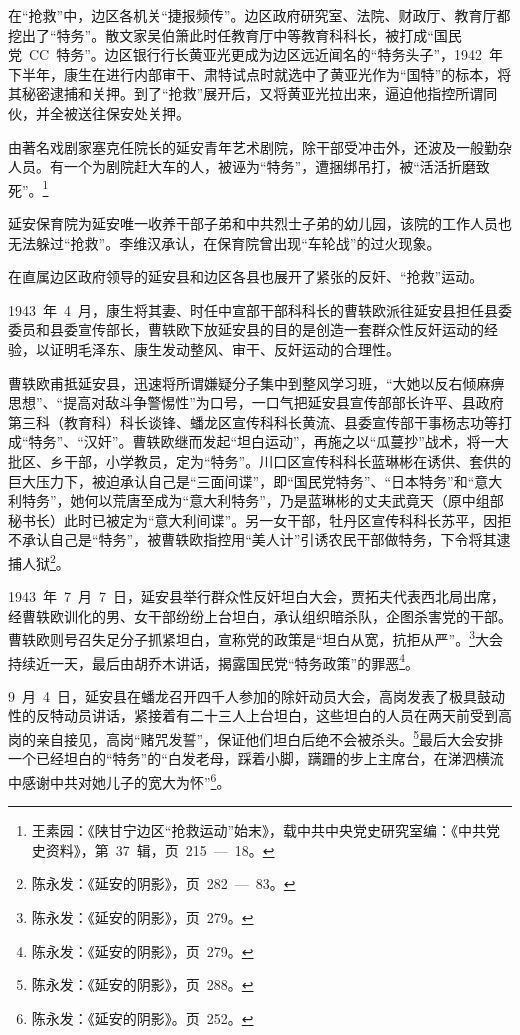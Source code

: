 在“抢救”中，边区各机关“捷报频传”。边区政府研究室、法院、财政厅、教育厅都挖出了“特务”。散文家吴伯箫此时任教育厅中等教育科科长，被打成“国民党~CC~特务”。边区银行行长黄亚光更成为边区远近闻名的“特务头子”，1942~年下半年，康生在进行内部审干、肃特试点时就选中了黄亚光作为“国特”的标本，将其秘密逮捕和关押。到了“抢救”展开后，又将黄亚光拉出来，逼迫他指控所谓同伙，并全被送往保安处关押。

由著名戏剧家塞克任院长的延安青年艺术剧院，除干部受冲击外，还波及一般勤杂人员。有一个为剧院赶大车的人，被诬为“特务”，遭捆绑吊打，被“活活折磨致死”。\footnote{王素园：《陕甘宁边区“抢救运动”始末》，载中共中央党史研究室编：《中共党史资料》，第~37~辑，页~215~—~18。}

延安保育院为延安唯一收养干部子弟和中共烈士子弟的幼儿园，该院的工作人员也无法躲过“抢救”。李维汉承认，在保育院曾出现“车轮战”的过火现象。

在直属边区政府领导的延安县和边区各县也展开了紧张的反奸、“抢救”运动。

1943~年~4~月，康生将其妻、时任中宣部干部科科长的曹轶欧派往延安县担任县委委员和县委宣传部长，曹轶欧下放延安县的目的是创造一套群众性反奸运动的经验，以证明毛泽东、康生发动整风、审干、反奸运动的合理性。

曹轶欧甫抵延安县，迅速将所谓嫌疑分子集中到整风学习班，“大她以反右倾麻痹思想”、“提高对敌斗争警惕性”为口号，一口气把延安县宣传部部长许平、县政府第三科（教育科）科长谈锋、蟠龙区宣传科科长黄流、县委宣传部干事杨志功等打成“特务”、“汉奸”。曹轶欧继而发起“坦白运动”，再施之以“瓜蔓抄”战术，将一大批区、乡干部，小学教员，定为“特务”。川口区宣传科科长蓝琳彬在诱供、套供的巨大压力下，被迫承认自己是“三面间谍”，即“国民党特务”、“日本特务”和“意大利特务”，她何以荒唐至成为“意大利特务”，乃是蓝琳彬的丈夫武竟天（原中组部秘书长）此时已被定为“意大利间谍”。另一女干部，牡丹区宣传科科长苏平，因拒不承认自己是“特务”，被曹轶欧指控用“美人计”引诱农民干部做特务，下令将其逮捕人狱\footnote{陈永发：《延安的阴影》，页~282~—~83。}。

1943~年~7~月~7~日，延安县举行群众性反奸坦白大会，贾拓夫代表西北局出席，经曹轶欧训化的男、女干部纷纷上台坦白，承认组织暗杀队，企图杀害党的干部。曹轶欧则号召失足分子抓紧坦白，宣称党的政策是“坦白从宽，抗拒从严”。\footnote{陈永发：《延安的阴影》，页~279。}大会持续近一天，最后由胡乔木讲话，揭露国民党“特务政策”的罪恶\footnote{陈永发：《延安的阴影》，页~279。}。

9~月~4~日，延安县在蟠龙召开四千人参加的除奸动员大会，高岗发表了极具鼓动性的反特动员讲话，紧接着有二十三人上台坦白，这些坦白的人员在两天前受到高岗的亲自接见，高岗“赌咒发誓”，保证他们坦白后绝不会被杀头。\footnote{陈永发：《延安的阴影》，页~288。}最后大会安排一个已经坦白的“特务”的“白发老母，踩着小脚，蹒跚的步上主席台，在涕泗横流中感谢中共对她儿子的宽大为怀”\footnote{陈永发：《延安的阴影》。页~252。}。

